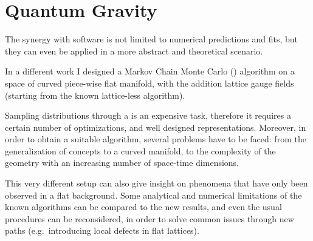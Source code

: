 \section{Quantum Gravity}

The synergy with software is not limited to numerical predictions and fits, but
they can even be applied in a more abstract and theoretical scenario.

In a different work I designed a Markov Chain Monte Carlo (\mcmc) algorithm on
a space of curved piece-wise flat manifold, with the addition lattice gauge
fields (starting from the known lattice-less algorithm).

Sampling distributions through a \mcmc is an expensive task, therefore it
requires a certain number of optimizations, and well designed representations.
Moreover, in order to obtain a suitable algorithm, several problems have to be
faced: from the generalization of \qcd concepts to a curved manifold, to the
complexity of the geometry with an increasing number of space-time dimensions.

This very different setup can also give insight on phenomena that have only
been observed in a flat background.
Some analytical and numerical limitations of the known algorithms can be
compared to the new results, and even the usual procedures can be reconsidered,
in order to solve common issues through new paths (e.g.\ introducing local
defects in flat lattices).
